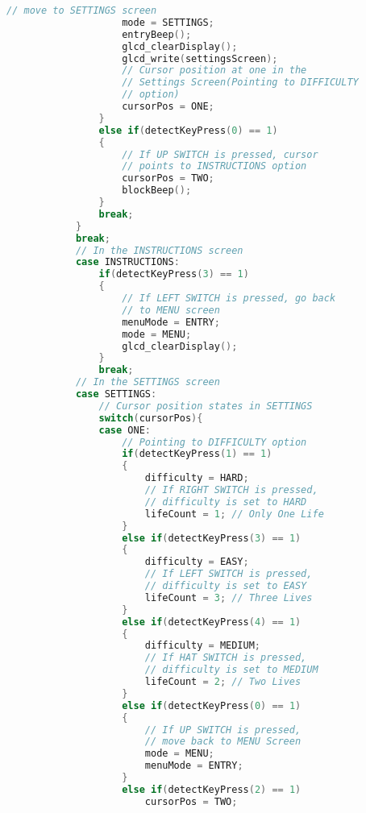 \documentclass{article}
\begin{document}
\begin{lstlisting}[basicstyle = \small, language = C]
                    // move to SETTINGS screen
                    mode = SETTINGS;
                    entryBeep();
                    glcd_clearDisplay();
                    glcd_write(settingsScreen);
                    // Cursor position at one in the 
                    // Settings Screen(Pointing to DIFFICULTY 
                    // option)
                    cursorPos = ONE;
                }
                else if(detectKeyPress(0) == 1)
                {
                    // If UP SWITCH is pressed, cursor 
                    // points to INSTRUCTIONS option
                    cursorPos = TWO;
                    blockBeep();
                }
                break;
            }
            break;
            // In the INSTRUCTIONS screen
            case INSTRUCTIONS:
                if(detectKeyPress(3) == 1)
                {
                    // If LEFT SWITCH is pressed, go back 
                    // to MENU screen
                    menuMode = ENTRY;
                    mode = MENU;
                    glcd_clearDisplay();
                }
                break;
            // In the SETTINGS screen
            case SETTINGS:
                // Cursor position states in SETTINGS
                switch(cursorPos){
                case ONE:
                    // Pointing to DIFFICULTY option
                    if(detectKeyPress(1) == 1)
                    {
                        difficulty = HARD; 
                        // If RIGHT SWITCH is pressed, 
                        // difficulty is set to HARD
                        lifeCount = 1; // Only One Life
                    }
                    else if(detectKeyPress(3) == 1)
                    {
                        difficulty = EASY; 
                        // If LEFT SWITCH is pressed,
                        // difficulty is set to EASY
                        lifeCount = 3; // Three Lives
                    }
                    else if(detectKeyPress(4) == 1)
                    {
                        difficulty = MEDIUM; 
                        // If HAT SWITCH is pressed, 
                        // difficulty is set to MEDIUM
                        lifeCount = 2; // Two Lives
                    }
                    else if(detectKeyPress(0) == 1)
                    {
                        // If UP SWITCH is pressed, 
                        // move back to MENU Screen
                        mode = MENU;
                        menuMode = ENTRY;
                    }
                    else if(detectKeyPress(2) == 1)
                        cursorPos = TWO; 

\end{lstlisting}
\end{document}
